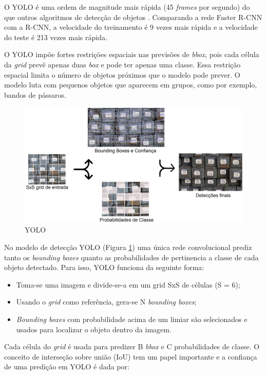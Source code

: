 O YOLO é uma ordem de magnitude mais rápida (45 \textit{frames} por segundo) do que outros algoritmos de detecção de objetos \cite{yolov3RealTime}. Comparando a rede Faster R-CNN com a  R-CNN, a velocidade do treinamento  é 9 vezes mais rápida e a velocidade do teste é 213 vezes mais rápida. \cite{7960069}

O YOLO impõe fortes restrições espaciais nas previsões de \textit{bbox}, pois cada célula da \textit{grid} prevê apenas duas \textit{box} e pode ter apenas uma classe. Essa restrição espacial limita o número de objetos próximos que o modelo pode prever. O modelo luta com pequenos objetos que aparecem em grupos, como por exemplo, bandos de pássaros. \cite{yolov3RealTime}

\begin{figure}[htbp]
		\centering
		\includegraphics[scale=0.2]{figuras/MachineLearning/yolo.png}
		\caption{YOLO}
		\label{fig:yolo}
\end{figure}

No modelo de detecção YOLO (Figura \ref{fig:yolo}) uma única rede convolucional prediz tanto os \textit{bounding boxes} quanto as probabilidades de pertinencia a classe de cada objeto detectado. Para isso, YOLO funciona da seguinte forma:

\begin{itemize}
    \item Toma-se uma imagem e divide-se-a em um grid SxS de células (S = 6);
    \item Usando o \textit{grid} como referência, gera-se N \textit{bounding boxes};
    \item \textit{Bounding boxes} com probabilidade acima de um limiar são selecionados e usados para localizar o objeto dentro da imagem.
\end{itemize}

Cada célula do  \textit{grid} é usada para predizer B  \textit{bbox} e C probabilidades de classe. O conceito de interseção sobre união (IoU) tem um papel importante e a confiança de uma predição em YOLO é dada por:

